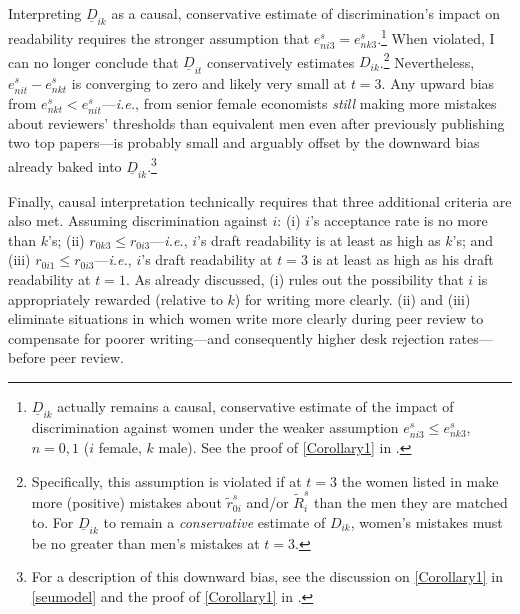 Interpreting $\underline D_{ik}$ as a causal, conservative estimate of discrimination's impact on readability requires the stronger assumption that $e_{ni3}^s=e_{nk3}^s$.\footnote{$\underline D_{ik}$ actually remains a causal, conservative estimate of the impact of discrimination against women under the weaker assumption $e_{ni3}^s\le e_{nk3}^s$, $n=0,1$ ($i$ female, $k$ male). See the proof of \autoref{Corollary1} in .} When violated, I can no longer conclude that $\underline D_{it}$ conservatively estimates $D_{ik}$.\footnote{Specifically, this assumption is violated if at $t=3$ the women listed in  make more (positive) mistakes about $\widetilde r_{0i}^s$ and\slash or $\widetilde R_i^s$ than the men they are matched to. For $\underline D_{ik}$ to remain a \emph{conservative} estimate of $D_{ik}$, women's mistakes must be no greater than men's mistakes at $t=3$.} Nevertheless, $e_{nit}^s-e_{nkt}^s$ is converging to zero and likely very small at $t=3$. Any upward bias from $e_{nkt}^s<e_{nit}^s$---\emph{i.e.}, from senior female economists \emph{still} making more mistakes about reviewers' thresholds than equivalent men even after previously publishing two top papers---is probably small and arguably offset by the downward bias already baked into $\underline D_{ik}$.\footnote{For a description of this downward bias, see the discussion on \autoref{Corollary1} in \autoref{seumodel} and the proof of \autoref{Corollary1} in .}

Finally, causal interpretation technically requires that three additional criteria are also met. Assuming discrimination against $i$: (i) $i$'s acceptance rate is no more than $k$'s; (ii) $r_{0k3}\le r_{0i3}$---\emph{i.e.}, $i$'s draft readability is at least as high as $k$'s; and (iii) $r_{0i1}\le r_{0i3}$---\emph{i.e.}, $i$'s draft readability at $t=3$ is at least as high as his draft readability at $t=1$. As already discussed, (i) rules out the possibility that $i$ is appropriately rewarded (relative to $k$) for writing more clearly. (ii) and (iii) eliminate situations in which women write more clearly during peer review to compensate for poorer writing---and consequently higher desk rejection rates---before peer review.

